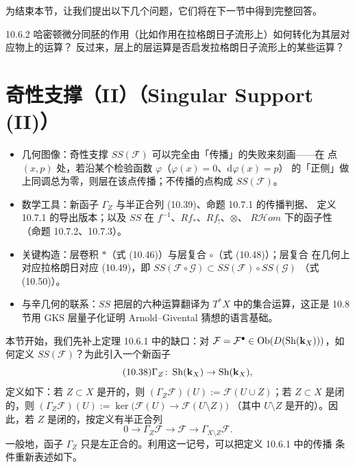 
为结束本节，让我们提出以下几个问题，它们将在下一节中得到完整回答。

\begin{wque}{10.6.2}
  哈密顿微分同胚的作用（比如作用在拉格朗日子流形上）如何转化为其层对应物上的运算？
  反过来，层上的层运算是否启发拉格朗日子流形上的某些运算？
\end{wque}

\section{奇性支撑（II）（Singular Support (II)）}

\begin{keytakeaways}
\begin{itemize}
  \item 几何图像：奇性支撑 $SS(\mathcal F)$ 可以完全由「传播」的失败来刻画——在
        点 $(x,p)$ 处，若沿某个检验函数 $\varphi$（$\varphi(x)=0$、$\mathrm d\varphi(x)=p$）
        的「正侧」做上同调总为零，则层在该点传播；不传播的点构成 $SS(\mathcal F)$。
  \item 数学工具：新函子 $\Gamma_Z$ 与半正合列 (10.39)、命题 10.7.1 的传播判据、
        定义 10.7.1 的导出版本；以及 $SS$ 在 $f^{-1}$、$Rf_*$、$Rf_!$、$\otimes$、
        $R\mathcal H om$ 下的函子性（命题 10.7.2、10.7.3）。
  \item 关键构造：层卷积 $*$（式 (10.46)）与层复合 $\circ$（式 (10.48)）；层复合
        在几何上对应拉格朗日对应 (10.49)，即
        $SS(\mathcal F\circ\mathcal G)\subset SS(\mathcal F)\circ SS(\mathcal G)$
        （式 (10.50)）。
  \item 与辛几何的联系：$SS$ 把层的六种运算翻译为 $T^*X$ 中的集合运算，这正是
        10.8 节用 GKS 层量子化证明 Arnold--Givental 猜想的语言基础。
\end{itemize}
\end{keytakeaways}

本节开始，我们先补上定理 10.6.1 中的缺口：对
$\mathcal F=\mathcal F^\bullet\in\operatorname{Ob}(D(\operatorname{Sh}(\mathbf{k}_X)))$，如何定义
$SS(\mathcal F)$？为此引入一个新函子
\begin{equation}\tag{10.38}
  \Gamma_Z\colon\operatorname{Sh}(\mathbf{k}_X)\to\operatorname{Sh}(\mathbf{k}_X),
\end{equation}
定义如下：若 $Z\subset X$ 是开的，则 $(\Gamma_Z\mathcal F)(U)
:=\mathcal F(U\cup Z)$；若 $Z\subset X$ 是闭的，则
$(\Gamma_Z\mathcal F)(U):=\ker\bigl(\mathcal F(U)\to\mathcal F(U\setminus Z)\bigr)$
（其中 $U\setminus Z$ 是开的）。因此，若 $Z$ 是闭的，按定义有半正合列
\begin{equation}\tag{10.39}
  0\to\Gamma_Z\mathcal F\to\mathcal F\to\Gamma_{X\setminus Z}\mathcal F.
\end{equation}
一般地，函子 $\Gamma_Z$ 只是左正合的。利用这一记号，可以把定义 10.6.1 中的传播
条件重新表述如下。

